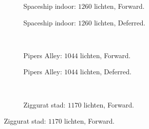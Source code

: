 \begin{figure}[p]
  \begin{adjustbox}{minipage=\textwidth, scale=0.6}
    \begin{subfigure}[b]{0.83\textwidth}
      \centering
      \def\svgwidth{\textwidth}
      
      \caption{Spaceship indoor: $1260$ lichten, Forward.}
      \label{fig:ts-resolution-forward:indoor}
    \end{subfigure}
  \end{adjustbox} %
  \begin{adjustbox}{minipage=\textwidth, scale=0.6}
    \begin{subfigure}[b]{0.83\textwidth}
      \centering
      \def\svgwidth{\textwidth}
      
      \caption{Spaceship indoor: $1260$ lichten, Deferred.}
      \label{fig:ts-resolution-deferred:indoor}
    \end{subfigure}
  \end{adjustbox} \\
  \begin{adjustbox}{minipage=\textwidth, scale=0.6}
    \begin{subfigure}[b]{0.83\textwidth}
      \centering
      \def\svgwidth{\textwidth}
      
      \caption{Pipers Alley: $1044$ lichten, Forward.}
      \label{fig:ts-resolution-forward:alley}
    \end{subfigure}
  \end{adjustbox} %
  \begin{adjustbox}{minipage=\textwidth, scale=0.6}
    \begin{subfigure}[b]{0.83\textwidth}
      \centering
      \def\svgwidth{\textwidth}
      
      \caption{Pipers Alley: $1044$ lichten, Deferred.}
      \label{fig:ts-resolution-deferred:alley}
    \end{subfigure}
  \end{adjustbox} \\
  \begin{adjustbox}{minipage=\textwidth, scale=0.6}
    \begin{subfigure}[b]{0.83\textwidth}
      \centering
      \def\svgwidth{\textwidth}
      
      \caption{Ziggurat stad: $1170$ lichten, Forward.}

\end{subfigure}
\end{adjustbox}
\end{figure}
